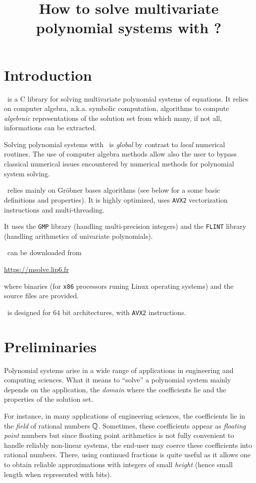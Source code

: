 \documentclass[a4paper,english,11pt]{scrartcl}
\title{How to solve multivariate polynomial systems with {\msolve}?}
\date{}
\theoremstyle{definition}
\theoremstyle{remark}
\begin{document}
\maketitle

\tableofcontents

\section{Introduction}

\msolve~is a C library for solving multivariate polynomial systems of equations. 
It relies on computer algebra, a.k.a. symbolic computation, algorithms to
compute \emph{algebraic} representations of the solution set from which
many, if not all, informations can be extracted.

Solving polynomial systems with \msolve~is \emph{global} by contrast to
\emph{local} numerical routines. The use of computer algebra methods allow also
the user to bypass classical numerical issues encountered by numerical methods
for polynomial system solving.

\msolve~relies mainly on Gr\"obner bases algorithms (see below for a some basic
definitions and properties). It is highly optimized, uses \texttt{AVX2}
vectorization instructions and multi-threading.

It uses the \texttt{GMP} library (handling multi-precision integers) and the
\texttt{FLINT} library (handling arithmetics of univariate polynomials).

\msolve~can be downloaded from
\begin{center}
  \url{https://msolve.lip6.fr}
\end{center}
where binaries (for \texttt{x86} processors runing Linux operating systems) and
the source files are provided.

\msolve~is designed for $64$ bit architectures, with \texttt{AVX2} instructions. 

\section{Preliminaries}

Polynomial systems arise in a wide range of applications in engineering and
computing sciences. What it means to ``solve'' a polynomial system mainly
depends on the application, the \emph{domain} where the coefficients lie and the
properties of the solution set.

For instance, in many applications of engineering sciences, the coefficients lie
in the \emph{field} of rational numbers $\mathbb{Q}$. Sometimes, these coefficients
appear as \emph{floating point} numbers but since floating point arithmetics is
not fully convenient to handle reliably non-linear systems, the end-user may
coerce these coefficients into rational numbers. There, using continued
fractions is quite useful as it allows one to obtain reliable approximations
with integers of small \emph{height} (hence small length when represented with
bits). 
\end{document}
